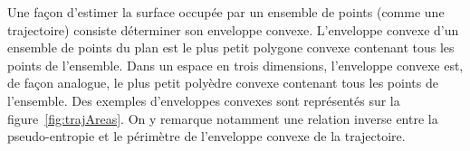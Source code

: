 	Une façon d'estimer la surface occupée par un ensemble de points (comme une trajectoire) consiste déterminer son enveloppe convexe. L'enveloppe convexe d'un ensemble de points du plan est le plus petit polygone convexe contenant tous les points de l'ensemble. Dans un espace en trois dimensions, l'enveloppe convexe est, de façon analogue, le plus petit polyèdre convexe contenant tous les points de l'ensemble. Des exemples d'enveloppes convexes sont représentés sur la figure~\ref{fig:trajAreas}. On y remarque notamment une relation inverse entre la pseudo-entropie et le périmètre de l'enveloppe convexe de la trajectoire. %
	
